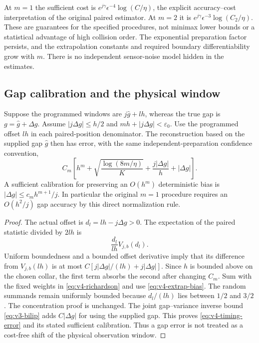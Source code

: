 At $m=1$ the sufficient cost is
$e^{j\gamma}\epsilon^{-4}\log(C/\eta)$, the explicit
accuracy--cost interpretation of the original paired estimator.
At $m=2$ it is $e^{j\gamma}\epsilon^{-3}\log(C_2/\eta)$.
These are guarantees for the specified procedures, not minimax lower
bounds or a statistical advantage of high collision order. The
exponential preparation factor persists, and the extrapolation
constants and required boundary differentiability grow with $m$.
There is no independent sensor-noise model hidden in the estimates.

\subsection{Gap calibration and the physical window}
\begin{proposition}
\label{prop:v4-timing}
Suppose the programmed windows are $j\widehat g+lh$, whereas the
true gap is $g=\widehat g+\Delta g$. Assume
$|j\Delta g|\le h/2$ and $mh+|j\Delta g|<\varepsilon_0$.
Use the programmed offset $lh$ in each paired-position denominator.
The reconstruction based on the supplied gap $\widehat g$ then has
error, with the same independent-preparation confidence convention,
\begin{equation}\label{eq:v4-timing-error}
 C_m\left[h^m+\sqrt{\frac{\log(8m/\eta)}K}
              +\frac{j|\Delta g|}h+|\Delta g|\right].
\end{equation}
A sufficient calibration for preserving an $O(h^m)$ deterministic
bias is $|\Delta g|\le c_mh^{m+1}/j$. In particular the original
$m=1$ procedure requires an $O(h^2/j)$ gap accuracy by this direct
normalization rule.
\end{proposition}
\begin{proof}
The actual offset is $d_l=lh-j\Delta g>0$. The expectation of the
paired statistic divided by $2lh$ is
\[
 \frac{d_l}{lh}V_{j,b}(d_l).
\]
Uniform boundedness and a bounded offset derivative imply that its
difference from $V_{j,b}(lh)$ is at most
$C[j|\Delta g|/(lh)+j|\Delta g|]$. Since $h$ is bounded above
on the chosen collar, the first term absorbs the second after changing
$C_m$. Sum with the fixed weights in \eqref{eq:v4-richardson} and
use \eqref{eq:v4-extrap-bias}. The random summands remain uniformly
bounded because $d_l/(lh)$ lies between $1/2$ and $3/2$.
The concentration proof is unchanged. The joint gap--variance inverse
bound \eqref{eq:v3-bilip} adds $C|\Delta g|$ for using the supplied
gap. This proves \eqref{eq:v4-timing-error} and its stated sufficient
calibration. Thus a gap error is not treated as a cost-free shift of
the physical observation window.
\end{proof}
